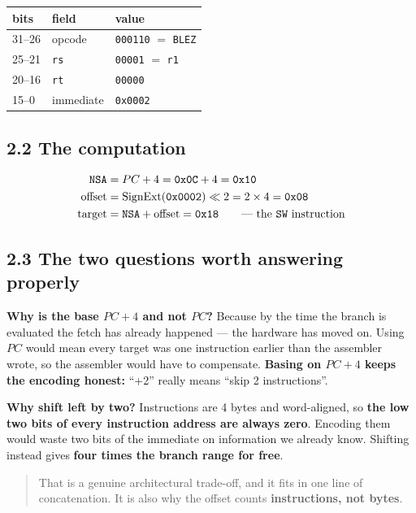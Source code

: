 \documentclass[11pt]{article}
\newcommand{\code}[1]{\texttt{#1}}
\begin{document}
\begin{center}
\begin{tabular}{lll}
\toprule
bits & field & value \\
\midrule
31--26 & opcode & \code{000110} $=$ \code{BLEZ} \\
25--21 & \code{rs} & \code{00001} $=$ \code{r1} \\
20--16 & \code{rt} & \code{00000} \\
15--0 & immediate & \code{0x0002} \\
\bottomrule
\end{tabular}
\end{center}

\subsection*{2.2 The computation}

\begin{align*}
\code{NSA}  &= PC + 4 = \code{0x0C} + 4 = \code{0x10} \\
\text{offset} &= \text{SignExt}(\code{0x0002}) \ll 2 = 2 \times 4 = \code{0x08} \\
\text{target} &= \code{NSA} + \text{offset} = \code{0x18} \qquad \text{--- the \code{SW} instruction}
\end{align*}

\subsection*{2.3 The two questions worth answering properly}

\textbf{Why is the base $PC+4$ and not $PC$?} Because by the time the branch is
evaluated the fetch has already happened --- the hardware has moved on. Using $PC$
would mean every target was one instruction earlier than the assembler wrote, so
the assembler would have to compensate. \textbf{Basing on $PC+4$ keeps the
encoding honest:} ``+2'' really means ``skip 2 instructions''.

\textbf{Why shift left by two?} Instructions are 4 bytes and word-aligned, so
\textbf{the low two bits of every instruction address are always zero}. Encoding
them would waste two bits of the immediate on information we already know.
Shifting instead gives \textbf{four times the branch range for free}.

\begin{quote}
That is a genuine architectural trade-off, and it fits in one line of
concatenation. It is also why the offset counts \textbf{instructions, not bytes}.
\end{quote}
\end{document}
